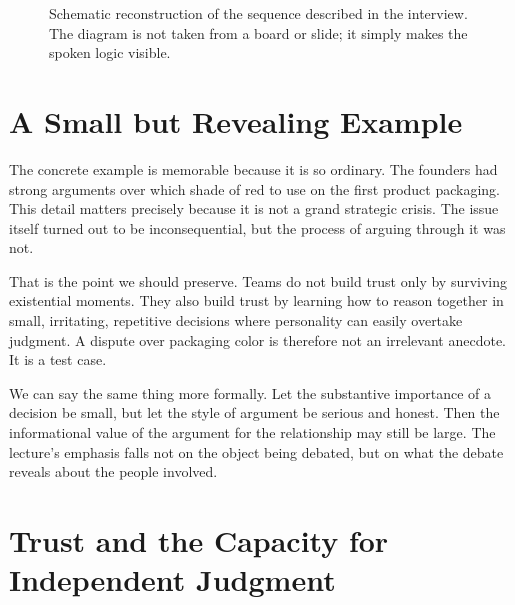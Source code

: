 \begin{figure}[h]
\centering
{}
\caption{Schematic reconstruction of the sequence described in the interview. The diagram is not taken from a board or slide; it simply makes the spoken logic visible.}
\end{figure}

\section{A Small but Revealing Example}

The concrete example is memorable because it is so ordinary. The founders had strong arguments over which shade of red to use on the first product packaging. This detail matters precisely because it is not a grand strategic crisis. The issue itself turned out to be inconsequential, but the process of arguing through it was not.

That is the point we should preserve. Teams do not build trust only by surviving existential moments. They also build trust by learning how to reason together in small, irritating, repetitive decisions where personality can easily overtake judgment. A dispute over packaging color is therefore not an irrelevant anecdote. It is a test case.

We can say the same thing more formally. Let the substantive importance of a decision be small, but let the style of argument be serious and honest. Then the informational value of the argument for the relationship may still be large. The lecture's emphasis falls not on the object being debated, but on what the debate reveals about the people involved.

\section{Trust and the Capacity for Independent Judgment}

